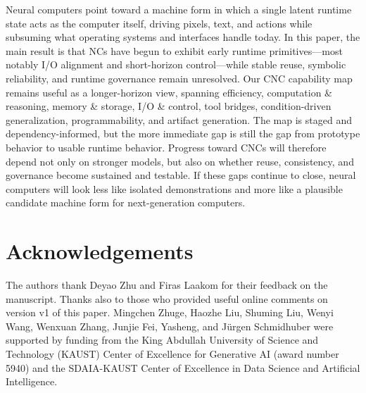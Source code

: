 Neural computers point toward a machine form in which a single latent runtime state acts as the computer itself, driving pixels, text, and actions while subsuming what operating systems and interfaces handle today.
In this paper, the main result is that NCs have begun to exhibit early runtime primitives---most notably I/O alignment and short-horizon control---while stable reuse, symbolic reliability, and runtime governance remain unresolved.
Our CNC capability map remains useful as a longer-horizon view, spanning efficiency, computation \& reasoning, memory \& storage, I/O \& control, tool bridges, condition-driven generalization, programmability, and artifact generation.
The map is staged and dependency-informed, but the more immediate gap is still the gap from prototype behavior to usable runtime behavior.
Progress toward CNCs will therefore depend not only on stronger models, but also on whether reuse, consistency, and governance become sustained and testable.
If these gaps continue to close, neural computers will look less like isolated demonstrations and more like a plausible candidate machine form for next-generation computers.

\section*{Acknowledgements}

The authors thank Deyao Zhu and Firas Laakom for their feedback on the manuscript. 
Thanks also to those who provided useful online comments on version v1 of this paper. 
Mingchen Zhuge, Haozhe Liu, Shuming Liu, Wenyi Wang, Wenxuan Zhang, Junjie Fei, Yasheng, and Jürgen Schmidhuber were supported by funding from the King Abdullah University of Science and Technology (KAUST) Center of Excellence for Generative AI (award number 5940) and the SDAIA-KAUST Center of Excellence in Data Science and Artificial Intelligence.
